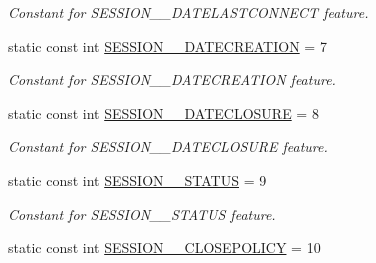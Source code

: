 \begin{DoxyCompactItemize}
\begin{DoxyCompactList}\small\item\em Constant for SESSION\_\-\_\-DATELASTCONNECT feature. \item\end{DoxyCompactList}\item 
\hypertarget{classUMS__Data_1_1UMS__DataPackage_a2d0a5d877f73213385f9d043c9743651}{
static const int \hyperlink{classUMS__Data_1_1UMS__DataPackage_a2d0a5d877f73213385f9d043c9743651}{SESSION\_\-\_\-DATECREATION} = 7}
\label{classUMS__Data_1_1UMS__DataPackage_a2d0a5d877f73213385f9d043c9743651}

\begin{DoxyCompactList}\small\item\em Constant for SESSION\_\-\_\-DATECREATION feature. \item\end{DoxyCompactList}\item 
\hypertarget{classUMS__Data_1_1UMS__DataPackage_a870200153f23867dd869f3ebe251b6c2}{
static const int \hyperlink{classUMS__Data_1_1UMS__DataPackage_a870200153f23867dd869f3ebe251b6c2}{SESSION\_\-\_\-DATECLOSURE} = 8}
\label{classUMS__Data_1_1UMS__DataPackage_a870200153f23867dd869f3ebe251b6c2}

\begin{DoxyCompactList}\small\item\em Constant for SESSION\_\-\_\-DATECLOSURE feature. \item\end{DoxyCompactList}\item 
\hypertarget{classUMS__Data_1_1UMS__DataPackage_a7ff54094507a9ae61efb3e4b3c8d2afa}{
static const int \hyperlink{classUMS__Data_1_1UMS__DataPackage_a7ff54094507a9ae61efb3e4b3c8d2afa}{SESSION\_\-\_\-STATUS} = 9}
\label{classUMS__Data_1_1UMS__DataPackage_a7ff54094507a9ae61efb3e4b3c8d2afa}

\begin{DoxyCompactList}\small\item\em Constant for SESSION\_\-\_\-STATUS feature. \item\end{DoxyCompactList}\item 
\hypertarget{classUMS__Data_1_1UMS__DataPackage_a32718def2b47a98f55bb93a8b316d7d5}{
static const int \hyperlink{classUMS__Data_1_1UMS__DataPackage_a32718def2b47a98f55bb93a8b316d7d5}{SESSION\_\-\_\-CLOSEPOLICY} = 10}
\label{classUMS__Data_1_1UMS__DataPackage_a32718def2b47a98f55bb93a8b316d7d5}


\end{DoxyCompactItemize}

